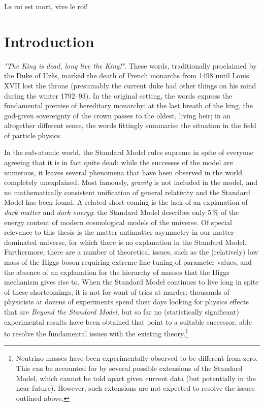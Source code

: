 \begin{savequote}[8cm]
Le roi est mort, vive le roi!
\end{savequote}

\chapter{Introduction}
\label{ch:1-intro} 

\emph{"The King is dead, long live the King!"}. These words, traditionally proclaimed by the Duke of Uzès, marked the death of French monarchs from 1498 until Louis XVII lost the throne (presumably the current duke had other things on his mind during the winter 1792--93). In the original setting, the words express the fundamental premise of hereditary monarchy: at the last breath of the king, the god-given sovereignty of the crown passes to the oldest, living heir; in an altogether different sense, the words fittingly summarise the situation in the field of particle physics. 

In the sub-atomic world, the Standard Model rules supreme in spite of everyone agreeing that it is in fact quite dead: while the successes of the model are numerous, it leaves several phenomena that have been observed in the world completely unexplained. Most famously, \emph{gravity} is not included in the model, and no mathematically consistent unification of general relativity and the Standard Model has been found. A related short coming is the lack of an explanation of \emph{dark matter} and \emph{dark energy}: the Standard Model describes only 5\,\% of the energy content of modern cosmological models of the universe. Of special relevance to this thesis is the matter-antimatter asymmetry in our matter-dominated universe, for which there is no explanation in the Standard Model. Furthermore, there are a number of theoretical issues, such as the (relatively) low mass of the Higgs boson requiring extreme fine tuning of parameter values, and the absence of an explanation for the hierarchy of masses that the Higgs mechanism gives rise to.
When the Standard Model continues to live long in spite of these shortcomings, it is not for want of tries at murder: thousands of physicists at dozens of experiments spend their days looking for physics effects that are \emph{Beyond the Standard Model}, but so far no (statistically significant) experimental results have been obtained that point to a suitable successor, able to resolve the fundamental issues with the existing theory.\footnote{Neutrino masses have been experimentally observed to be different from zero. This can be accounted for by several possible extensions of the Standard Model, which cannot be told apart given current data (but potentially in the near future). However, such extensions are not expected to resolve the issues outlined above.} 

